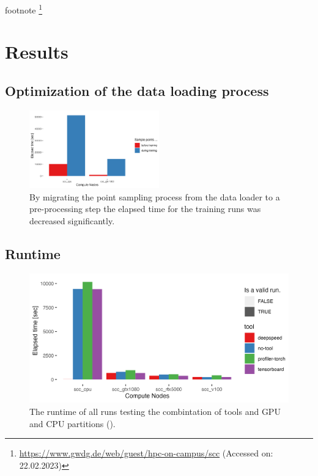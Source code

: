 \documentclass[12pt, a4paper, hidelinks]{article}
\begin{document}
footnote \footnote{\url{https://www.gwdg.de/web/guest/hpc-on-campus/scc} (Accessed on: 22.02.2023)}

\section{Results}
\label{sec:results}

\subsection{Optimization of the data loading process}
\label{sec:r-data-loading}



\begin{figure}[H]
\centering
\includegraphics[width=0.5\textwidth]{./assets/sacct_barplot_by_nodes_sample-points-effect}
\caption[Data loading optimization]{By migrating the point sampling process from the data loader to a pre-processing step the elapsed time for the training runs was decreased significantly.}
\label{fig:sacct_barplot_by_nodes_sample-points-effect}
\end{figure}

\subsection{Runtime}
\label{sec:r-runtime}

\begin{figure}[H]
\centering
\includegraphics[width=1\textwidth]{./assets/sacct_barplot_by_nodes_no-experiment}
\caption[Runtime of the experiments]{The runtime of all runs testing the combintation of tools and \ac{GPU} and \ac{CPU} partitions (). }
\label{fig:sacct_barplot_by_nodes_no-experiment}
\end{figure}
\end{document}
